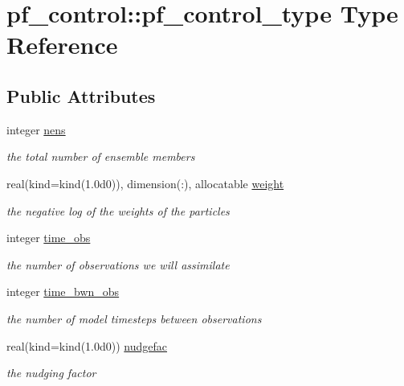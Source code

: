 \hypertarget{structpf__control_1_1pf__control__type}{\section{pf\-\_\-control\-:\-:pf\-\_\-control\-\_\-type Type Reference}
\label{structpf__control_1_1pf__control__type}
}
\subsection*{Public Attributes}
\begin{DoxyCompactItemize}
\item 
integer \hyperlink{structpf__control_1_1pf__control__type_a54b2dd5d94eb5fd34e0384490b7a293e}{nens}
\begin{DoxyCompactList}\small\item\em the total number of ensemble members \end{DoxyCompactList}\item 
real(kind=kind(1.\-0d0)), dimension(\-:), allocatable \hyperlink{structpf__control_1_1pf__control__type_a6924d4f75cbd9e358263f7cfe453e063}{weight}
\begin{DoxyCompactList}\small\item\em the negative log of the weights of the particles \end{DoxyCompactList}\item 
integer \hyperlink{structpf__control_1_1pf__control__type_a7199be1c1a99f9f066af0ee214f51824}{time\-\_\-obs}
\begin{DoxyCompactList}\small\item\em the number of observations we will assimilate \end{DoxyCompactList}\item 
integer \hyperlink{structpf__control_1_1pf__control__type_a13e65bce20eb3de30403efca169f9635}{time\-\_\-bwn\-\_\-obs}
\begin{DoxyCompactList}\small\item\em the number of model timesteps between observations \end{DoxyCompactList}\item 
real(kind=kind(1.\-0d0)) \hyperlink{structpf__control_1_1pf__control__type_ae8e8786c073ded3dc39645629863cb73}{nudgefac}
\begin{DoxyCompactList}\small\item\em the nudging factor \end{DoxyCompactList}\item 

\end{DoxyCompactItemize}
